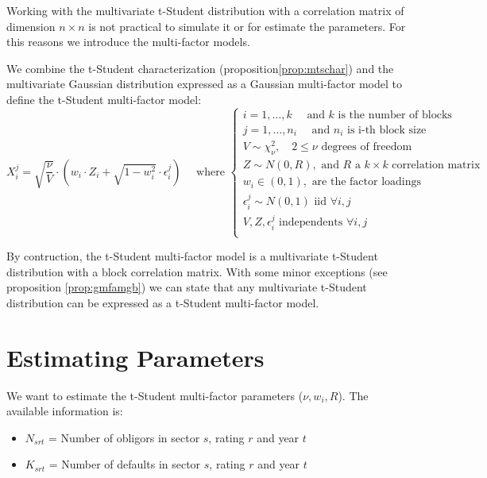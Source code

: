 \documentclass[11pt,fleqn]{book} %
\begin{document}
Working with the multivariate t-Student distribution with a correlation
matrix of dimension $n \times n$ is not practical to simulate it or for
estimate the parameters. For this reasons we introduce the multi-factor 
models.

\begin{definition}
	We combine the t-Student characterization (proposition\ref{prop:mtschar})
	and the multivariate Gaussian distribution expressed as a
	Gaussian multi-factor model to define the t-Student multi-factor
	model:
	\begin{displaymath}
		X_i^j = \sqrt{\frac{\nu}{V}} \cdot 
		\left( w_i \cdot Z_i + \sqrt{1-w_i^2} \cdot \epsilon_i^j \right)
		\quad \text{ where } \left\{
		\begin{array}{l}
			i = 1, \dots, k \quad \text{ and $k$ is the number of blocks}    \\
			j = 1, \dots, n_i \quad \text{ and $n_i$ is i-th block size}     \\
			V \sim \chi_{\nu}^2, \quad 2 \le \nu \text{ degrees of freedom}  \\
			Z \sim N(0,R), \text{ and $R$ a $k \times k$ correlation matrix} \\
			w_i \in (0,1), \text{ are the factor loadings }                  \\
			\epsilon_i^j \sim N(0,1) \text { iid } \forall i,j               \\
			V, Z, \epsilon_i^j \text{ independents } \forall i,j             \\
		\end{array}
		\right.
	\end{displaymath}
\end{definition}

By contruction, the t-Student multi-factor model is a multivariate
t-Student distribution with a block correlation matrix. With some
minor exceptions (see proposition \ref{prop:gmfamgb}) we can 
state that any multivariate t-Student distribution can be expressed
as a t-Student multi-factor model.

\chapter{Estimating Parameters}

We want to estimate the t-Student multi-factor parameters 
($\nu, w_i, R$). The available information is:
\begin{itemize}
	\item $N_{srt}$ = Number of obligors in sector $s$, rating $r$ and year $t$
	\item $K_{srt}$ = Number of defaults in sector $s$, rating $r$ and year $t$
\end{itemize}
\end{document}
